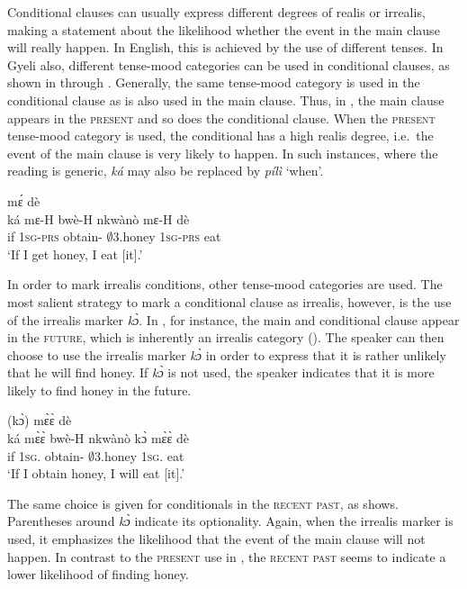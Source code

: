 Conditional clauses can usually express different degrees of realis or irrealis, making a statement about the likelihood whether the event in the main clause will really happen. In English, this is achieved by the use of different tenses. In Gyeli also, different tense-mood categories can be used in conditional clauses, as shown in  through . Generally, the same tense-mood category is used in the conditional clause as is also used in the main clause. Thus, in , the main clause appears in the \textsc{present} and so does the conditional clause. When the \textsc{present} tense-mood category is used, the conditional has a high realis degree, i.e.\ the event of the main clause is very likely to happen. In such instances, where the reading is generic, {\itshape ká} may also be replaced by {\itshape pílì} `when'.


\ea\label{ka6}
  \textsubscript{{\COND}} mɛ́ dè \\
       {\db}ká mɛ-H bwè-H nkwànò mɛ-H dè \\
       {\db}if 1\textsc{sg}-\textsc{prs} obtain-{\R} $\emptyset$3.honey 1\textsc{sg}-\textsc{prs} eat \\ 
 \trans `If I get honey, I eat [it].'
\z

In order to mark irrealis conditions, other tense-mood categories are used.
The most salient strategy to mark a conditional clause as irrealis, however, is the use of the irrealis marker {\itshape kɔ̀}. In , for instance, the main and conditional clause appear in the \textsc{future}, which is inherently an irrealis category (). The speaker can then choose to use the irrealis marker {\itshape kɔ̀} in order to express that it is rather unlikely that he will find honey. If {\itshape kɔ̀} is not used, the speaker indicates that it is more likely to find honey in the future.


\ea\label{ka7}
  \textsubscript{{\COND}} (kɔ̀) mɛ̀ɛ̀ dè \\
       {\db}ká mɛ̀ɛ̀ bwè-H nkwànò {\db}kɔ̀ mɛ̀ɛ̀ dè\\
       {\db}if 1\textsc{sg}.{\FUT} obtain-{\R} $\emptyset$3.honey {\db}{\IRR} 1\textsc{sg}.{\FUT} eat \\
 \trans `If I obtain honey, I will eat [it].'
\z

The same choice is given for conditionals in the \textsc{recent past}, as  shows. Parentheses around {\itshape kɔ̀} indicate its optionality. Again, when the irrealis marker is used, it emphasizes the likelihood that the event of the main clause will not happen. In contrast to the \textsc{present} use in , the \textsc{recent past} seems to indicate a lower likelihood of finding honey.



